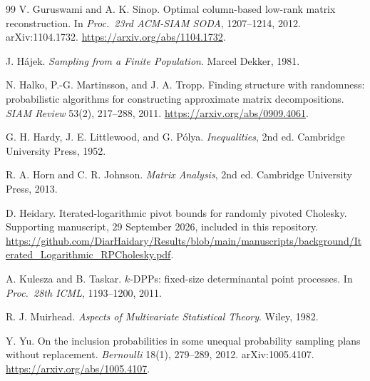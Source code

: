 \documentclass[11pt,a4paper]{article}
\theoremstyle{definition}
\begin{document}
\begin{thebibliography}{99}
V. Guruswami and A. K. Sinop.
Optimal column-based low-rank matrix reconstruction.
In \emph{Proc.\ 23rd ACM-SIAM SODA}, 1207--1214, 2012. arXiv:1104.1732.
\url{https://arxiv.org/abs/1104.1732}.

J. H\'ajek.
\emph{Sampling from a Finite Population}. Marcel Dekker, 1981.

N. Halko, P.-G. Martinsson, and J. A. Tropp.
Finding structure with randomness: probabilistic algorithms for constructing approximate matrix decompositions.
\emph{SIAM Review} 53(2), 217--288, 2011.
\url{https://arxiv.org/abs/0909.4061}.

G. H. Hardy, J. E. Littlewood, and G. P\'olya.
\emph{Inequalities}, 2nd ed. Cambridge University Press, 1952.

R. A. Horn and C. R. Johnson.
\emph{Matrix Analysis}, 2nd ed. Cambridge University Press, 2013.

D. Heidary.
Iterated-logarithmic pivot bounds for randomly pivoted Cholesky.
Supporting manuscript, 29 September 2026, included in this repository.
\url{https://github.com/DiarHaidary/Results/blob/main/manuscripts/background/Iterated_Logarithmic_RPCholesky.pdf}.

A. Kulesza and B. Taskar.
$k$-DPPs: fixed-size determinantal point processes.
In \emph{Proc.\ 28th ICML}, 1193--1200, 2011.

R. J. Muirhead.
\emph{Aspects of Multivariate Statistical Theory}. Wiley, 1982.

Y. Yu.
On the inclusion probabilities in some unequal probability sampling plans without replacement.
\emph{Bernoulli} 18(1), 279--289, 2012. arXiv:1005.4107.
\url{https://arxiv.org/abs/1005.4107}.

\end{thebibliography}
\end{document}
